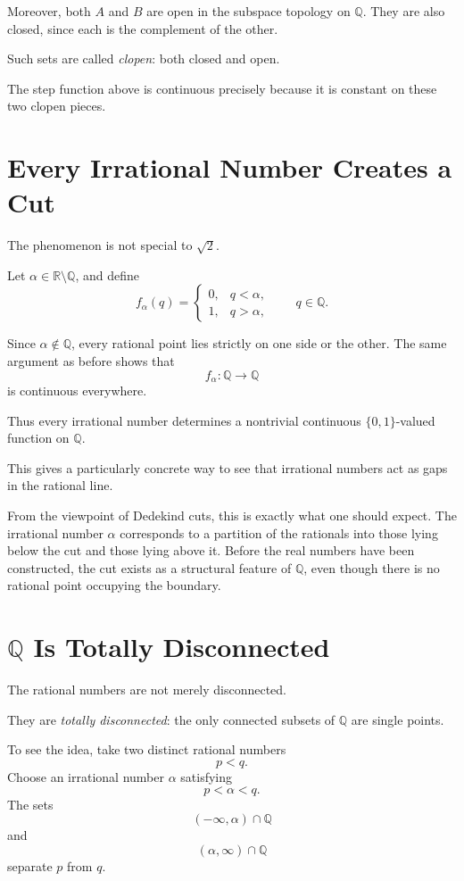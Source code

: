 \documentclass{essay}
\begin{document}
Moreover, both \(A\) and \(B\) are open in the subspace topology on
\(\mathbb{Q}\). They are also closed, since each is the complement of the
other.

Such sets are called \emph{clopen}: both closed and open.

The step function above is continuous precisely because it is constant on
these two clopen pieces.

\section{Every Irrational Number Creates a Cut}

The phenomenon is not special to \(\sqrt{2}\).

Let \(\alpha\in\mathbb{R}\setminus\mathbb{Q}\), and define
\[
  f_{\alpha}(q)=
  \begin{cases}
    0,&q<\alpha,\\
    1,&q>\alpha,
  \end{cases}
  \qquad q\in\mathbb{Q}.
\]

Since \(\alpha\notin\mathbb{Q}\), every rational point lies strictly on one
side or the other. The same argument as before shows that
\[ f_{\alpha}:\mathbb{Q}\to\mathbb{Q} \]
is continuous everywhere.

Thus every irrational number determines a nontrivial continuous
\(\{0,1\}\)-valued function on \(\mathbb{Q}\).

This gives a particularly concrete way to see that irrational numbers act as
gaps in the rational line.

From the viewpoint of Dedekind cuts, this is exactly what one should expect.
The irrational number \(\alpha\) corresponds to a partition of the rationals
into those lying below the cut and those lying above it. Before the real
numbers have been constructed, the cut exists as a structural feature of
\(\mathbb{Q}\), even though there is no rational point occupying the boundary.

\section{\(\mathbb{Q}\) Is Totally Disconnected}

The rational numbers are not merely disconnected.

They are \emph{totally disconnected}: the only connected subsets of
\(\mathbb{Q}\) are single points.

To see the idea, take two distinct rational numbers
\[ p<q. \]
Choose an irrational number \(\alpha\) satisfying
\[ p<\alpha<q. \]
The sets
\[ (-\infty,\alpha)\cap\mathbb{Q} \]
and
\[ (\alpha,\infty)\cap\mathbb{Q} \]
separate \(p\) from \(q\).
\end{document}
